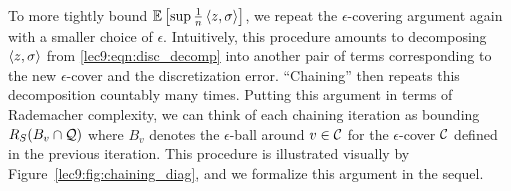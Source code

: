 \begin{remark}
To more tightly bound $\operatorname*{\mathbb{E}} \left[ \sup \frac 1 n \left\langle z,\sigma\right\rangle\right]$, we repeat the $\epsilon$-covering argument again with a smaller choice of $\epsilon$. Intuitively, this  procedure amounts to decomposing $\left\langle z, \sigma\right\rangle$ from \eqref{lec9:eqn:disc_decomp} into another pair of terms corresponding to the new $\epsilon$-cover and the discretization error. ``Chaining'' then repeats this decomposition countably many times. Putting this argument in terms of Rademacher complexity, we can think of each chaining iteration as bounding $R_S(B_{v} \cap \mathcal Q)$ where $B_{v}$ denotes the $\epsilon$-ball around $v \in \mathcal C$ for the $\epsilon$-cover $\mathcal C$ defined in the previous iteration. This procedure is illustrated visually by Figure~\ref{lec9:fig:chaining_diag}, and we formalize this argument in the sequel.
\end{remark}

